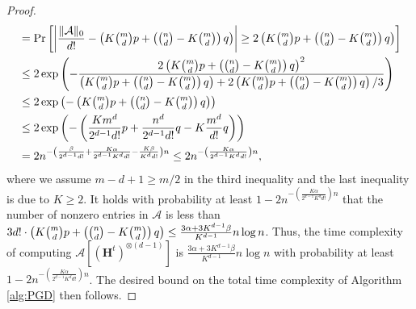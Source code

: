 \documentclass{article}
\theoremstyle{plain}
\theoremstyle{definition}
\theoremstyle{remark}
\newcommand{\ACal}{\mathcal{A}}
\begin{document}
\begin{appendix}
\begin{center}
\begin{proof}
\begin{align*}
				& = \operatorname{Pr} \left[ \left| \frac{\|\ACal\|_0}{d!}- \left(K\tbinom{m}{d}p + \left(\tbinom{n}{d} -K \tbinom{m}{d}\right)q \right) \right|\ge 2\left(K\tbinom{m}{d}p + \left(\tbinom{n}{d} -K \tbinom{m}{d}\right)q \right)\right] \\
				&\le 2 \exp\left(-\frac{2\left(K\tbinom{m}{d}p + \left(\tbinom{n}{d} -K \tbinom{m}{d}\right)q \right)^2}{\left(K\tbinom{m}{d}p + \left(\tbinom{n}{d} -K \tbinom{m}{d}\right)q \right) + 2\left(K\tbinom{m}{d}p + \left(\tbinom{n}{d} -K \tbinom{m}{d}\right)q \right)/3}\right)\\
				&\le 2\exp \left( -\left(K\tbinom{m}{d}p + \left(\tbinom{n}{d} -K \tbinom{m}{d}\right)q \right)\right)\\
				& \leq 2 \exp \left(- \left(\frac{K m^d}{2^{d-1} d!}p + \frac{n^d }{2^{d-1} d!}q - K\frac{m^d}{d!}q \right) \right)\\
				&= 2n^{- \left(\frac{\beta}{2^{d-1}d!} + \frac{K\alpha}{2^{d-1}K^d d!} - \frac{K\beta}{K^d d!} \right)n} \leq 2n^{- \left( \frac{K\alpha}{2^{d-1}K^d d!} \right)n},
			\end{align*}
			where we assume $m-d+1 \geq m/2$ in the third inequality and the last inequality is due to $K\geq 2$. It holds with probability at least $1 - 2n^{- \left( \frac{K\alpha}{2^{d-1}K^d d!} \right)n}$ that the number of nonzero entries in $\mathcal{A}$ is less than $3 d! \cdot \left(K\tbinom{m}{d}p + \left(\tbinom{n}{d} -K \tbinom{m}{d}\right)q \right) \leq  \frac{3\alpha + 3K^{d-1}\beta}{K^{d-1}}n \log n$. Thus, the time complexity of computing $\ACal\left[ \left(\bm{H}^{t} \right)^{\otimes (d-1)}\right]$ is $\frac{3\alpha + 3K^{d-1}\beta}{K^{d-1}}n \log n$ with probability at least $1 - 2n^{- \left( \frac{K\alpha}{2^{d-1}K^d d!} \right)n}$. The desired bound on the total time complexity of Algorithm \ref{alg:PGD} then follows.
		\end{proof}

\end{center}
\end{appendix}
\end{document}
